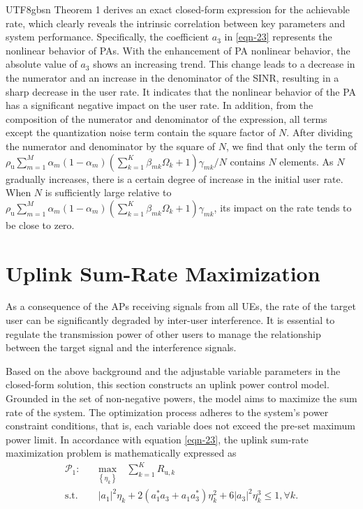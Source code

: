 \documentclass[lettersize,journal]{IEEEtran}
\begin{document}
\begin{CJK}{UTF8}{gbsn}
Theorem 1 derives an exact closed-form expression for the achievable rate, which clearly reveals the intrinsic correlation between key parameters and system performance. Specifically, the coefficient $a_3$ in \eqref{eqn-23} represents the nonlinear behavior of PAs. With the enhancement of PA nonlinear behavior, the absolute value of $a_3$ shows an increasing trend. This change leads to a decrease in the numerator and an increase in the denominator of the SINR, resulting in a sharp decrease in the user rate. It indicates that the nonlinear behavior of the PA has a significant negative impact on the user rate.
In addition, from the composition of the numerator and denominator of the expression, all terms except the quantization noise term contain the square factor of $N$. After dividing the numerator and denominator by the square of $N$, we find that only the term of ${\rho _\text{u}}\mathop \sum \limits_{m = 1}^M {\alpha _m}(1 - {\alpha _m})\left( {\mathop \sum \limits_{k = 1}^K {\beta _{mk}}\Omega _k + 1} \right){\gamma _{mk}}/N$ contains $N$ elements. As $N$ gradually increases, there is a certain degree of increase in the initial user rate. When $N$ is sufficiently large relative to ${\rho _\text{u}}\mathop \sum \limits_{m = 1}^M {\alpha _m}(1 - {\alpha _m})\left( {\mathop \sum \limits_{k = 1}^K {\beta _{mk}}\Omega _k + 1} \right){\gamma _{mk}}$, its impact on the rate tends to be close to zero.

\section{Uplink Sum-Rate Maximization}
As a consequence of the APs receiving signals from all UEs, the rate of the target user can be significantly degraded by inter-user interference. It is essential to regulate the transmission power of other users to manage the relationship between the target signal and the interference signals.

Based on the above background and the adjustable variable parameters in the closed-form solution, this section constructs an uplink power control model. Grounded in the set of non-negative powers, the model aims to maximize the sum rate of the system. The optimization process adheres to the system's power constraint conditions, that is, each variable does not exceed the pre-set maximum power limit. In accordance with equation \eqref{eqn-23}, the uplink sum-rate maximization problem is mathematically expressed as
\begin{align} \label{P1}
\mathcal{P}_1:& \quad \underset{\left \{ \eta _k \right \} }{\text{max}} \quad  {\sum_{k=1}^{K}} R_{\text{u},k}\\
\text{s.t.}&\quad {\left| {{a_1}} \right|^2}{\eta _k} + 2(a_1^ * {a_3} + {a_1}a_3^ * )\eta _k^2 + 6{\left| {{a_3}} \right|^2}\eta _k^3 \le 1, \forall k.
\end{align}


\end{CJK}
\end{document}
